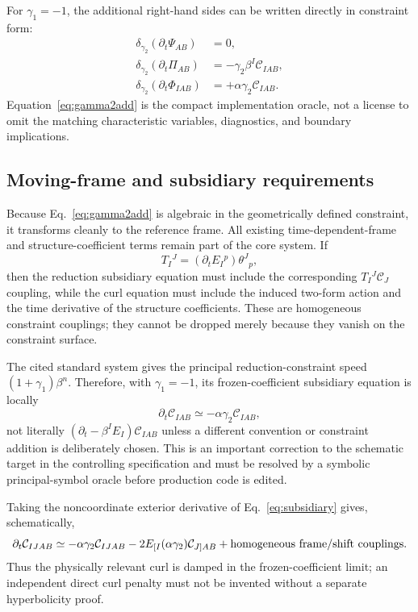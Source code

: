 \documentclass[11pt]{article}
\newcommand{\CI}{\mathcal{C}_{IAB}}
\newcommand{\CIJ}{\mathcal{C}_{IJAB}}
\begin{document}
For $\gamma_1=-1$, the additional right-hand sides can be written directly in
constraint form:
\begin{align}
 \delta_{\gamma_2}(\partial_t\Psi_{AB}) &= 0, \\
 \delta_{\gamma_2}(\partial_t\Pi_{AB}) &=
       -\gamma_2\beta^I\CI, \\
 \delta_{\gamma_2}(\partial_t\Phi_{IAB}) &=
       +\alpha\gamma_2\CI. \label{eq:gamma2add}
\end{align}
Equation~\eqref{eq:gamma2add} is the compact implementation oracle, not a
license to omit the matching characteristic variables, diagnostics, and
boundary implications.

\subsection{Moving-frame and subsidiary requirements}

Because Eq.~\eqref{eq:gamma2add} is algebraic in the geometrically defined
constraint, it transforms cleanly to the reference frame.  All existing
time-dependent-frame and structure-coefficient terms remain part of the core
system.  If
\begin{equation}
 T_I{}^J=(\partial_t E_I{}^p)\theta^J{}_p,
\end{equation}
then the reduction subsidiary equation must include the corresponding
$T_I{}^J\mathcal C_J$ coupling, while the curl equation must include the
induced two-form action and the time derivative of the structure coefficients.
These are homogeneous constraint couplings; they cannot be dropped merely
because they vanish on the constraint surface.

The cited standard system gives the principal reduction-constraint speed
$(1+\gamma_1)\beta^n$.  Therefore, with $\gamma_1=-1$, its frozen-coefficient
subsidiary equation is locally
\begin{equation}
 \partial_t\CI \simeq -\alpha\gamma_2\CI,
 \label{eq:subsidiary}
\end{equation}
not literally $(\partial_t-\beta^I E_I)\CI$ unless a different convention or
constraint addition is deliberately chosen.  This is an important correction
to the schematic target in the controlling specification and must be resolved
by a symbolic principal-symbol oracle before production code is edited.

Taking the noncoordinate exterior derivative of
Eq.~\eqref{eq:subsidiary} gives, schematically,
\begin{equation}
 \partial_t\CIJ \simeq -\alpha\gamma_2\CIJ
  -2E_{[I}(\alpha\gamma_2)\mathcal C_{J]AB}
  +\hbox{homogeneous frame/shift couplings}.
\end{equation}
Thus the physically relevant curl is damped in the frozen-coefficient limit;
an independent direct curl penalty must not be invented without a separate
hyperbolicity proof.
\end{document}
